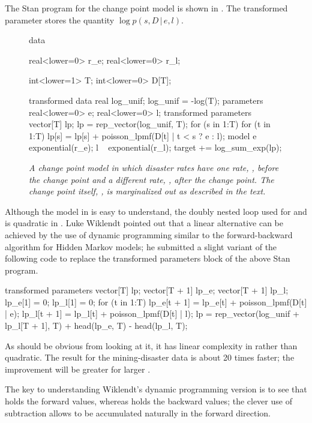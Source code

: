 The Stan program for the change point model is shown in
.  The transformed parameter
 stores the quantity $\log p(s, D \, | \, e, l)$.
%
\begin{figure}
\begin{stancode}
data {
  real<lower=0> r_e;
  real<lower=0> r_l;

  int<lower=1> T;
  int<lower=0> D[T];
}
transformed data {
  real log_unif;
  log_unif = -log(T);
}
parameters {
  real<lower=0> e;
  real<lower=0> l;
}
transformed parameters {
  vector[T] lp;
  lp = rep_vector(log_unif, T);
  for (s in 1:T)
    for (t in 1:T)
      lp[s] = lp[s] + poisson_lpmf(D[t] | t < s ? e : l);
}
model {
  e ~ exponential(r_e);
  l ~ exponential(r_l);
  target += log_sum_exp(lp);
}    
\end{stancode}
\vspace*{-6pt}
\caption{\small\it A change point model in which disaster rates
   have one rate, , before the change point and a
  different rate, , after the change point.  The change point
  itself, , is marginalized out as described in the
  text.}\label{change-point-model.figure}
\end{figure}

Although the model in  is easy to
understand, the doubly nested loop used for  and  is
quadratic in .  Luke Wiklendt pointed out that a linear
alternative can be achieved by the use of dynamic programming similar
to the forward-backward algorithm for Hidden Markov models;  he
submitted a slight variant of the following code to replace the
transformed parameters block of the above Stan program.
%
\begin{stancode}
transformed parameters {
    vector[T] lp;
    {
      vector[T + 1] lp_e;
      vector[T + 1] lp_l;
      lp_e[1] = 0;
      lp_l[1] = 0;
      for (t in 1:T) {
        lp_e[t + 1] = lp_e[t] + poisson_lpmf(D[t] | e);
        lp_l[t + 1] = lp_l[t] + poisson_lpmf(D[t] | l);
      }
      lp = rep_vector(log_unif + lp_l[T + 1], T)
           + head(lp_e, T) - head(lp_l, T);
    }
  }
\end{stancode}
%
As should be obvious from looking at it, it has linear complexity in
 rather than quadratic.  The result for the mining-disaster
data is about 20 times faster;  the improvement will be greater for
larger .

The key to understanding Wiklendt's dynamic programming version is to
see that  holds the forward values, whereas
 holds the backward values; the
clever use of subtraction allows  to be accumulated
naturally in the forward direction.



